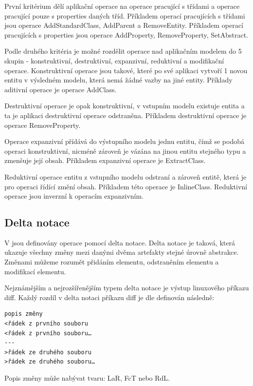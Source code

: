 \documentclass[11pt,twoside,a4paper]{book}
\begin{document}
První kritérium dělí aplikační operace na operace pracující s třídami a operace
pracující pouze s properties daných tříd. Příkladem operací pracujících s
třídami jsou operace AddStandardClass, AddParent a RemoveEntity. Příkladem
operací pracujících s properties jsou operace AddProperty, RemoveProperty,
SetAbstract.

Podle druhého kritéria je možné rozdělit operace nad aplikačním modelem do 5
skupin - konstruktivní, destruktivní, expanzivní, reduktivní a modifikační operace.
Konstruktivní operace jsou takové, které po své aplikaci vytvoří 1 novou entitu
v výsledném modelu, která nemá žádné vazby na jiné entity. Příklady aditivní
operace je operace AddClass. 

Destruktivní operace je opak konstruktivní, v vstupním modelu existuje entita a
ta je aplikaci destruktivní operace odstraněna. Příkladem destruktivní operace
je operace RemoveProperty.

Operace expanzivní přídává do výstupního modelu jednu entitu, čímž se
podobá operaci konstruktivní, nicméně zároveň je vázána na jinou entitu
stejného typu a zmenšuje její obsah. Příkladem expanzivní operace je
ExtractClass.

Reduktivní operace entitu z vstupního modelu odstraní a zároveň entitě, která
je pro operaci řídící změní obsah. Příkladem této operace je InlineClass.
Reduktivní operace jsou inverzní k operacím expanzivním.\\

\subsection{Delta notace}
V \cite{Cincetti} jsou definovány operace pomocí delta notace. Delta notace
je taková, která ukazuje všechny změny mezi danými dvěma artefakty stejné
úrovně abstrakce. Změnami můžeme rozumět přidáním elementu, odstraněním elementu
a modifikací elementu.

Nejznámějším a nejrozšířenějším typem delta notace je výstup linuxového příkazu
diff. Každý rozdíl v delta notaci příkazu diff je dle \cite{diff_wiki}
definován následně:

\begin{verbatim}
popis změny
<řádek z prvního souboru
<řádek z prvního souboru…
---
>řádek ze druhého souboru
>řádek ze druhého souboru…
\end{verbatim}

Popis změny může nabývat tvaru: LaR, FcT nebo RdL.\\
\end{document}
